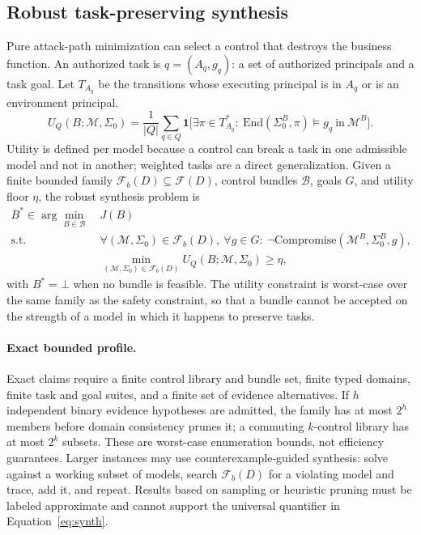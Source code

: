 \documentclass[11pt,letterpaper]{article}
\theoremstyle{definition}
\newcommand{\St}{\Sigma}
\newcommand{\End}{\mathrm{End}}
\newcommand{\Fam}{\mathcal{F}}
\newcommand{\Mod}{\mathcal{M}}
\newcommand{\Comp}{\mathrm{Compromise}}
\begin{document}
\subsection{Robust task-preserving synthesis}

Pure attack-path minimization can select a control that destroys the business function. An authorized task is $q=(A_q,g_q)$: a set of authorized principals and a task goal. Let $T_{A_q}$ be the transitions whose executing principal is in $A_q$ or is an environment principal.
\begin{equation}\label{eq:utility}
U_Q(B;\Mod,\St_0)=\frac{1}{|Q|}\sum_{q\in Q}\mathbf{1}\big[\exists\pi\in T_{A_q}^{*}:\ \End(\St_0^{B},\pi)\models g_q\ \text{in}\ \Mod^{B}\big].
\end{equation}
Utility is defined per model because a control can break a task in one admissible model and not in another; weighted tasks are a direct generalization. Given a finite bounded family $\Fam_b(D)\subseteq\Fam(D)$, control bundles $\mathcal{B}$, goals $G$, and utility floor $\eta$, the robust synthesis problem is
\begin{equation}\label{eq:synth}
\begin{aligned}
B^{*}\in\arg\min_{B\in\mathcal{B}}\ & J(B)\\
\text{s.t.}\ \ & \forall(\Mod,\St_0)\in\Fam_b(D),\ \forall g\in G:\ \neg\Comp(\Mod^{B},\St_0^{B},g),\\
& \min_{(\Mod,\St_0)\in\Fam_b(D)} U_Q(B;\Mod,\St_0)\ge\eta ,
\end{aligned}
\end{equation}
with $B^{*}=\bot$ when no bundle is feasible. The utility constraint is worst-case over the same family as the safety constraint, so that a bundle cannot be accepted on the strength of a model in which it happens to preserve tasks.

\paragraph{Exact bounded profile.} Exact claims require a finite control library and bundle set, finite typed domains, finite task and goal suites, and a finite set of evidence alternatives. If $h$ independent binary evidence hypotheses are admitted, the family has at most $2^{h}$ members before domain consistency prunes it; a commuting $k$-control library has at most $2^{k}$ subsets. These are worst-case enumeration bounds, not efficiency guarantees. Larger instances may use counterexample-guided synthesis: solve against a working subset of models, search $\Fam_b(D)$ for a violating model and trace, add it, and repeat. Results based on sampling or heuristic pruning must be labeled approximate and cannot support the universal quantifier in Equation~\eqref{eq:synth}.
\end{document}
